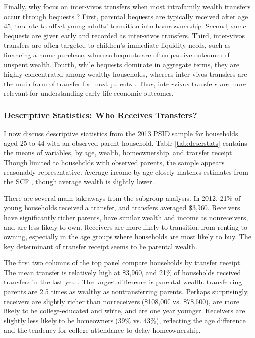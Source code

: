 \documentclass[12pt]{article}
\begin{document}
Finally, why focus on inter-vivos transfers when most intrafamily wealth transfers occur through bequests \citep[see e.g.,][]{feiveson2019lifecycle}? First, parental bequests are typically received after age 45, too late to affect young adults' transition into homeownership. Second, some bequests are given early and recorded as inter-vivos transfers. Third, inter-vivos transfers are often targeted to children's immediate liquidity needs, such as financing a home purchase, whereas bequests are often passive outcomes of unspent wealth. Fourth, while bequests dominate in aggregate terms, they are highly concentrated among wealthy households, whereas inter-vivos transfers are the main form of transfer for most parents \citep{yang2023financial}. Thus, inter-vivos transfers are more relevant for understanding early-life economic outcomes. 


\subsubsection{Descriptive Statistics: Who Receives Transfers?}
I now discuss descriptive statistics from the 2013 PSID sample for households aged 25 to 44 with an observed parent household. Table \ref{tab:descrstats} contains the means of variables, by age, wealth, homeownership, and transfer receipt. Though limited to households with observed parents, the sample appears reasonably representative. Average income by age closely matches estimates from the SCF \cite[see e.g.,][]{kuhn20162013}, though average wealth is slightly lower.

There are several main takeaways from the subgroup analysis. In 2012, 21\% of young households received a transfer, and transfers averaged \$3,960. Receivers have significantly richer parents, have similar wealth and income as nonreceivers, and are less likely to own. Receivers are more likely to transition from renting to owning, especially in the age groups where households are most likely to buy. The key determinant of transfer receipt seems to be parental wealth.

The first two columns of the top panel compare households by transfer receipt. The mean transfer is relatively high at \$3,960, and 21\% of households received transfers in the last year. The largest difference is parental wealth: transferring parents are 2.5 times as wealthy as nontransferring parents. Perhaps surprisingly, receivers are slightly richer than nonreceivers (\$108,000 vs. \$78,500), are more likely to be college-educated and white, and are one year younger. Receivers are slightly less likely to be homeowners (39\% vs. 43\%), reflecting the age difference and the tendency for college attendance to delay homeownership.
\end{document}
